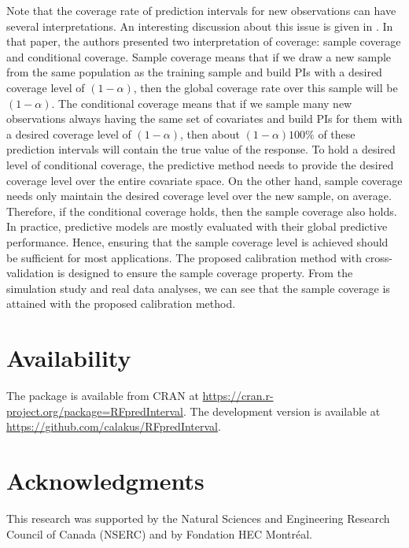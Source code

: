 Note that the coverage rate of prediction intervals for new observations can have several interpretations. An interesting discussion about this issue is given in \citet{mayr_prediction_2012}. In that paper, the authors presented two interpretation of coverage: sample coverage and conditional coverage. Sample coverage means that if we draw a new sample from the same population as the training sample and build PIs with a desired coverage level of $\left(1-\alpha\right)$, then the global coverage rate over this sample will be $\left(1-\alpha\right)$. The conditional coverage means that if we sample many new observations always having the same set of covariates and build PIs for them with a desired coverage level of $\left(1-\alpha\right)$, then about $\left(1-\alpha\right)100\%$ of these prediction intervals will contain the true value of the response. To hold a desired level of conditional coverage, the predictive method needs to provide the desired coverage level over the entire covariate space. On the other hand, sample coverage needs only maintain the desired coverage level over the new sample, on average. Therefore, if the conditional coverage holds, then the sample coverage also holds. In practice, predictive models are mostly evaluated with their global predictive performance. Hence, ensuring that the sample coverage level is achieved should be sufficient for most applications. The proposed calibration method with cross-validation is designed to ensure the sample coverage property. From the simulation study and real data analyses, we can see that the sample coverage is attained with the proposed calibration method.

\section{Availability}

The package is available from CRAN at \url{https://cran.r-project.org/package=RFpredInterval}. The development version is available at \url{https://github.com/calakus/RFpredInterval}.

\section{Acknowledgments}

This research was supported by the Natural Sciences and Engineering Research Council of Canada (NSERC) and by Fondation HEC Montr\'eal.



